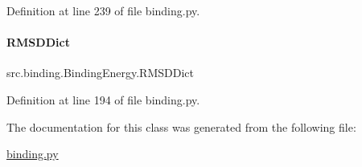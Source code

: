 Definition at line 239 of file binding.\+py.

\mbox{\label{classsrc_1_1binding_1_1BindingEnergy_a3ce83ed981346e4539b5f0450207b64d}} 
\paragraph{\texorpdfstring{R\+M\+S\+D\+Dict}{RMSDDict}}
{\footnotesize\ttfamily src.\+binding.\+Binding\+Energy.\+R\+M\+S\+D\+Dict}



Definition at line 194 of file binding.\+py.



The documentation for this class was generated from the following file\+:\begin{DoxyCompactItemize}
\item 
\hyperlink{binding_8py}{binding.\+py}\end{DoxyCompactItemize}
